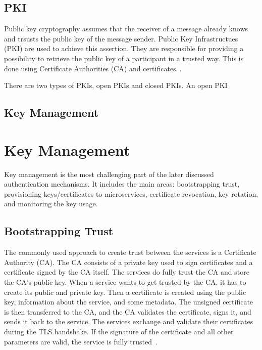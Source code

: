 \subsection{PKI}
Public key cryptography assumes that the receiver of a message already knows and trsusts the public key of the message sender.
Public Key Infrastructues (PKI) are used to achieve this assertion.
They are responsible for providing a possibility to retrieve the public key of a participant in a trusted way.
This is done using Certificate Authorities (CA) and certificates~\cite{anderson2020security}.

There are two types of PKIs, open PKIs and closed PKIs.
An open PKI 

\subsection{Key Management} \label{sec:key_management}
\section{Key Management}
Key management is the most challenging part of the later discussed authentication mechanisms.
It includes the main areas: bootstrapping trust, provisioning keys/certificates to microservices, certificate revocation, key rotation, and monitoring the key usage. 

\subsection{Bootstrapping Trust}
The commonly used approach to create trust between the services is a Certificate Authority (CA). 
The CA consists of a private key used to sign certificates and a certificate signed by the CA itself.
The services do fully trust the CA and store the CA's public key. 
When a service wants to get trusted by the CA, it has to create its public and private key. 
Then a certificate is created using the public key, information about the service, and some metadata. 
The unsigned certificate is then transferred to the CA, and the CA validates the certificate, signs it, and sends it back to the service. 
The services exchange and validate their certificates during the TLS handshake.
If the signature of the certificate and all other parameters are valid, the service is fully trusted~\cite{dias2020microservices}.

